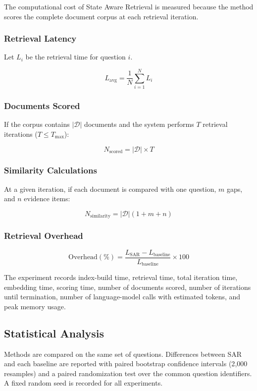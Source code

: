 \documentclass[12pt,a4paper]{report}
\begin{document}
The computational cost of State Aware Retrieval is measured because the
method scores the complete document corpus at each retrieval iteration.

\subsubsection{Retrieval Latency}

Let $L_i$ be the retrieval time for question $i$.

\[
L_{\mathrm{avg}}
=
\frac{1}{N}
\sum_{i=1}^{N}L_i
\]

\subsubsection{Documents Scored}

If the corpus contains $|\mathcal{D}|$ documents and the system performs
$T$ retrieval iterations ($T\leq T_{\max}$):

\[
N_{\mathrm{scored}}
=
|\mathcal{D}|\times T
\]

\subsubsection{Similarity Calculations}

At a given iteration, if each document is compared with one question, $m$ gaps, and $n$
evidence items:

\[
N_{\mathrm{similarity}}
=
|\mathcal{D}|(1+m+n)
\]

\subsubsection{Retrieval Overhead}

\[
\mathrm{Overhead(\%)}
=
\frac{
L_{\mathrm{SAR}}-L_{\mathrm{baseline}}
}
{
L_{\mathrm{baseline}}
}
\times100
\]

The experiment records index-build time, retrieval time, total iteration time, embedding time, scoring time, number of documents scored, number of iterations until termination, number of language-model calls with estimated tokens, and peak memory usage.

\subsection{Statistical Analysis}

Methods are compared on the same set of questions. Differences between SAR and each baseline are reported with paired bootstrap confidence intervals (2{,}000 resamples) and a paired randomization test over the common question identifiers. A fixed random seed is recorded for all experiments.
\clearpage
\end{document}
